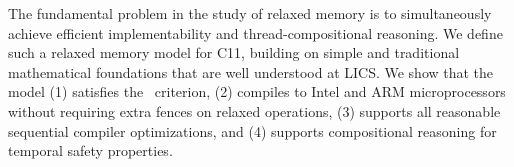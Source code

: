 The fundamental problem in the study of relaxed memory is to simultaneously achieve efficient implementability and thread-compositional reasoning.  We define such a relaxed memory model for C11, building on simple and traditional mathematical  foundations that are well understood at LICS.   We show that the model (1) satisfies the \drfsc\ criterion, (2)
compiles to Intel and ARM microprocessors %
without requiring extra fences on relaxed operations, (3)
supports all reasonable sequential compiler optimizations, and (4) supports compositional reasoning for temporal safety properties.
